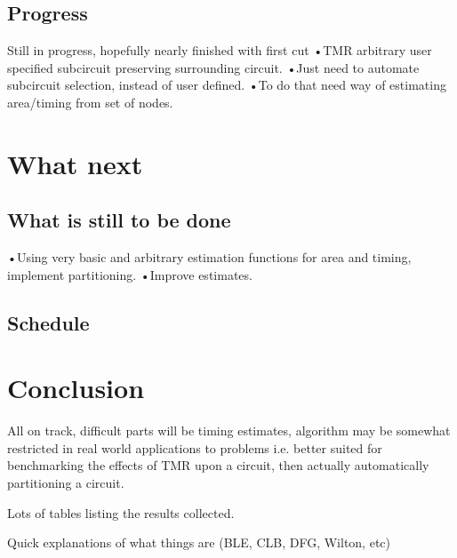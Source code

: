 \documentclass[12pt,draft,a4paper,oneside]{memoir} %
\begin{document}
\section{Progress}
Still in progress, hopefully nearly finished with first cut
•TMR arbitrary user specified subcircuit preserving surrounding circuit.
•Just need to automate subcircuit selection, instead of user defined.
•To do that need way of estimating area/timing from set of nodes.

\chapter{What next}
\section{What is still to be done}
•Using very basic and arbitrary estimation functions for area and timing, implement partitioning.
•Improve estimates.
\section{Schedule}

\chapter{Conclusion}
All on track, difficult parts will be timing estimates, algorithm may be somewhat restricted in real world applications to problems i.e. better suited for benchmarking the effects of TMR upon a circuit, then actually automatically partitioning a circuit.

Lots of tables listing the results collected.

Quick explanations of what things are (BLE, CLB, DFG, Wilton, etc)



\end{document}
